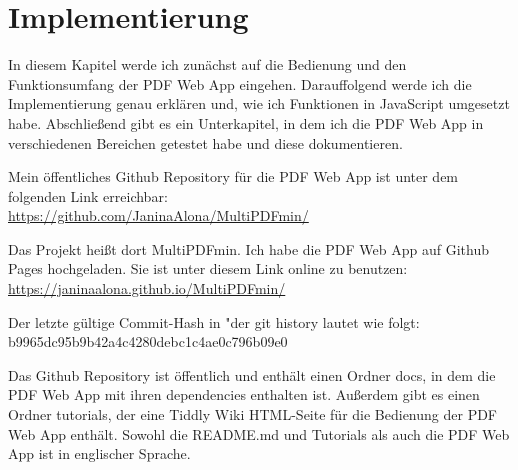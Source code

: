 \chapter{Implementierung}
In diesem Kapitel werde ich zunächst auf die Bedienung und den Funktionsumfang der PDF Web App eingehen. Darauffolgend werde ich die Implementierung genau erklären und, wie ich Funktionen in JavaScript umgesetzt habe. Abschließend gibt es ein Unterkapitel, in dem ich die PDF Web App in verschiedenen Bereichen getestet habe und diese dokumentieren.

Mein öffentliches Github Repository für die PDF Web App ist unter dem folgenden Link erreichbar: \\
\url{https://github.com/JaninaAlona/MultiPDFmin/}

Das Projekt heißt dort MultiPDFmin. Ich habe die PDF Web App auf Github Pages hochgeladen. Sie ist unter diesem Link online zu benutzen: \\
\url{https://janinaalona.github.io/MultiPDFmin/}

Der letzte gültige Commit-Hash in "der git history lautet wie folgt: \\
b9965dc95b9b42a4c4280debc1c4ae0c796b09e0

Das Github Repository ist öffentlich und enthält einen Ordner docs, in dem die PDF Web App mit ihren dependencies enthalten ist. Außerdem gibt es einen Ordner tutorials, der eine Tiddly Wiki HTML-Seite für die Bedienung der PDF Web App enthält. Sowohl die README.md und Tutorials als auch die PDF Web App ist in englischer Sprache.



